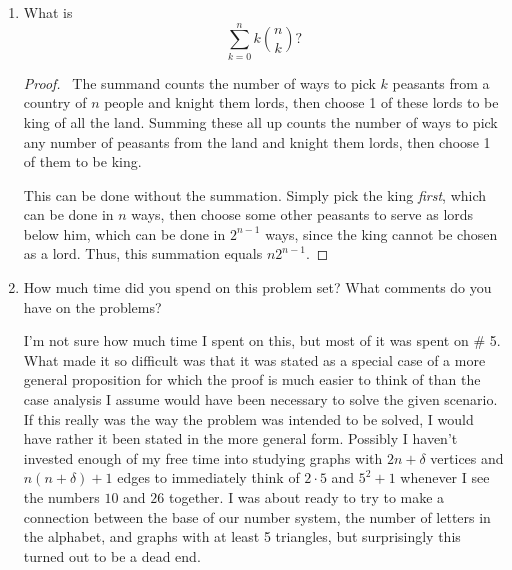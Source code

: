 \documentclass[12pt]{article}
\begin{document}
\begin{enumerate}[leftmargin=0cm,itemindent=.5cm,labelwidth=\itemindent,labelsep=0cm,align=left]
\begin{proof}
Let $K$ be the graph formed by removing $a$ and all incident edges from $G$.  Then $a$ is no different than $x$ was in our construction of $H$, thus $K$ also has $n-1$ triangles.  However, $K$ does not contain the triangle $\{a,b,c\}$.  Therefore, $G$ must have $n$ triangles.  This completes the case where $\delta = 0$.

Now, assume $\delta = 1$.  Then $G$ has $2n+1$ vertices and $n(n+1)+1 = n^2 + n + 1$ edges.  So the average degree of $G$ is
$$
\frac{2(n^2 + n + 1)}{2n+1} = \frac{2n^2 + n + n + 2}{2n+1} = n + \frac{2+n}{2n+1} < n
$$
because $n > 1$ (so $2+n < 2n+1$).  Therefore, $G$ contains a vertex $x$ of degree $n$.  The subgraph $H$ formed by removing $x$ and all incident edges has $2n$ vertices and $n^2 + 1$ edges.  This is simply the case where $\delta = 0$, which we have just proved.  So $H$ contains $n$ triangles, thus $G$ contains $n$ triangles.
\end{proof}

\item What is $$\sum\limits_{k=0}^n k \binom{n}{k}?$$

\begin{proof}

\ The summand counts the number of ways to pick $k$ peasants from a country of $n$ people and knight them lords, then choose 1 of these lords to be king of all the land.  Summing these all up counts the number of ways to pick any number of peasants from the land and knight them lords, then choose 1 of them to be king.

This can be done without the summation.  Simply pick the king \emph{first}, which can be done in $n$ ways, then choose some other peasants to serve as lords below him, which can be done in $2^{n-1}$ ways, since the king cannot be chosen as a lord.  Thus, this summation equals $n 2^{n-1}$.

\end{proof}

\item How much time did you spend on this problem set?  What comments do you have on the problems?

I'm not sure how much time I spent on this, but most of it was spent on \# 5.  What made it so difficult was that it was stated as a special case of a more general proposition for which the proof is much easier to think of than the case analysis I assume would have been necessary to solve the given scenario.  If this really was the way the problem was intended to be solved, I would have rather it been stated in the more general form.  Possibly I haven't invested enough of my free time into studying graphs with $2n + \delta$ vertices and $n(n+\delta) + 1$ edges to immediately think of $2 \cdot 5$ and $5^2 + 1$ whenever I see the numbers $10$ and $26$ together.  I was about ready to try to make a connection between the base of our number system, the number of letters in the alphabet, and graphs with at least 5 triangles, but surprisingly this turned out to be a dead end.


\end{enumerate}
\end{document}
